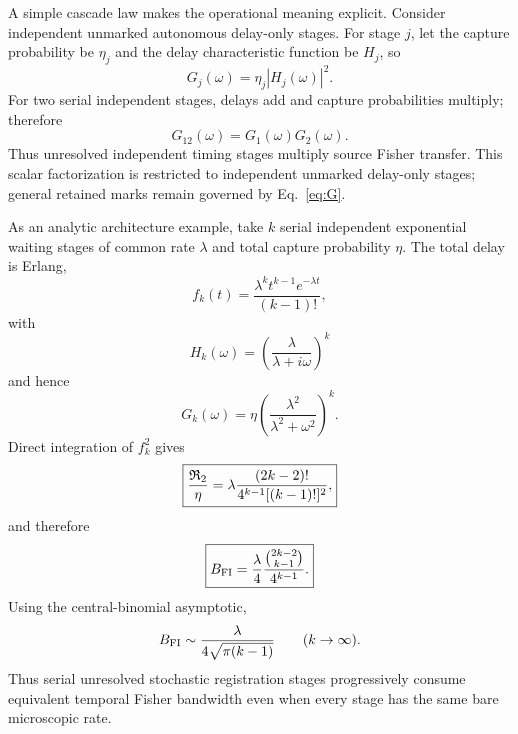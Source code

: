 A simple cascade law makes the operational meaning explicit. Consider independent unmarked autonomous delay-only stages. For stage $j$, let the capture probability be $\eta_j$ and the delay characteristic function be $H_j$, so
\begin{equation}
G_j(\omega)=\eta_j|H_j(\omega)|^2.
\end{equation}
For two serial independent stages, delays add and capture probabilities multiply; therefore
\begin{equation}
\boxed{
G_{12}(\omega)=G_1(\omega)G_2(\omega).}
\label{eq:cascade}
\end{equation}
Thus unresolved independent timing stages multiply source Fisher transfer. This scalar factorization is restricted to independent unmarked delay-only stages; general retained marks remain governed by Eq.~\eqref{eq:G}.

As an analytic architecture example, take $k$ serial independent exponential waiting stages of common rate $\lambda$ and total capture probability $\eta$. The total delay is Erlang,
\begin{equation}
f_k(t)=\frac{\lambda^k t^{k-1}e^{-\lambda t}}{(k-1)!},
\end{equation}
with
\begin{equation}
H_k(\omega)=\left(\frac{\lambda}{\lambda+i\omega}\right)^k
\end{equation}
and hence
\begin{equation}
\boxed{
G_k(\omega)
=\eta\left(\frac{\lambda^2}{\lambda^2+\omega^2}\right)^k.}
\label{eq:ErlangG}
\end{equation}
Direct integration of $f_k^2$ gives
\begin{equation}
\boxed{
\frac{\mathfrak R_2}{\eta}
=\lambda\frac{(2k-2)!}{4^{k-1}[(k-1)!]^2},}
\label{eq:ErlangR2}
\end{equation}
and therefore
\begin{equation}
\boxed{
B_{\rm FI}
=\frac{\lambda}{4}
\frac{\binom{2k-2}{k-1}}{4^{k-1}}.}
\label{eq:ErlangBFI}
\end{equation}
Using the central-binomial asymptotic,
\begin{equation}
B_{\rm FI}
\sim\frac{\lambda}{4\sqrt{\pi(k-1)}}
\qquad (k\to\infty).
\label{eq:ErlangAsymptotic}
\end{equation}
Thus serial unresolved stochastic registration stages progressively consume equivalent temporal Fisher bandwidth even when every stage has the same bare microscopic rate.
